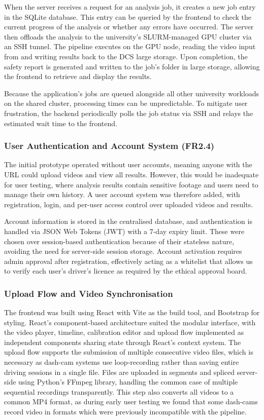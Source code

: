 \documentclass{article}
\begin{document}
When the server receives a request for an analysis job, it creates a new job entry in the SQLite database. This entry can be queried by the frontend to check the current progress of the analysis or whether any errors have occurred. The server then offloads the analysis to the university’s SLURM-managed GPU cluster via an SSH tunnel. The pipeline executes on the GPU node, reading the video input from and writing results back to the DCS large storage. Upon completion, the safety report is generated and written to the job's folder in large storage, allowing the frontend to retrieve and display the results.

Because the application’s jobs are queued alongside all other university workloads on the shared cluster, processing times can be unpredictable. To mitigate user frustration, the backend periodically polls the job status via SSH and relays the estimated wait time to the frontend.

\subsubsection{User Authentication and Account System (FR2.4)}
The initial prototype operated without user accounts, meaning anyone with the URL could upload videos and view all results. However, this would be inadequate for user testing, where analysis results contain sensitive footage and users need to manage their own history. A user account system was therefore added, with registration, login, and per-user access control over uploaded videos and results.

Account information is stored in the centralised database, and authentication is handled via JSON Web Tokens (JWT) with a 7-day expiry limit. These were chosen over session-based authentication because of their stateless nature, avoiding the need for server-side session storage. Account activation requires admin approval after registration, effectively acting as a whitelist that allows us to verify each user’s driver’s licence as required by the ethical approval board.

\subsubsection{Upload Flow and Video Synchronisation}
The frontend was built using React with Vite as the build tool, and Bootstrap for styling. React’s component-based architecture suited the modular interface, with the video player, timeline, calibration editor and upload flow implemented as independent components sharing state through React’s context system. The upload flow supports the submission of multiple consecutive video files, which is necessary as dash-cam systems use loop-recording rather than saving entire driving sessions in a single file. Files are uploaded in segments and spliced server-side using Python's FFmpeg library, handling the common case of multiple sequential recordings transparently. This step also converts all videos to a common MP4 format, as during early user testing we found that some dash-cams record video in formats which were previously incompatible with the pipeline. 
\end{document}

